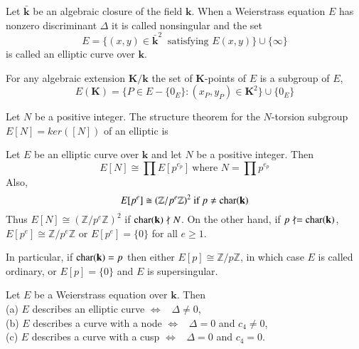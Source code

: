 \begin{definition}
    Let $\bar{\mathbf{k}}$ be an algebraic closure of the field $\mathbf{k}$. When a Weierstrass equation 
    $E$ has nonzero discriminant $\Delta$ it is called nonsingular and the set 
    \begin{equation*}
        E= \{(x,y)\in \bar{\mathbf{k}}^2 \ \text{ satisfying $E(x,y)$}\} \cup \{\infty\}
    \end{equation*}
is called an elliptic curve over $\mathbf{k}$.
\end{definition}
\begin{definition}
    For any algebraic extension $\mathbf{K}/\mathbf{k}$ the set of $\mathbf{K}$-points of $E$ is a subgroup
    of $E$, 
    \begin{equation*}
        E(\mathbf{K})=\{P\in E-\{0_E\}:(x_P,y_P)\in \mathbf{K}^2\}\cup \{0_E\}
    \end{equation*}
\end{definition}
Let $N$ be a positive integer. The structure theorem for the $N$-torsion subgroup $E[N]=ker([N])$ of an elliptic is 
\begin{theorem}
    Let $E$ be an elliptic curve over $\mathbf{k}$ and let $N$ be a positive integer. Then 
    \begin{equation*}
        E[N]\cong \prod E[p^{e_p}] \ \text{where $N=\prod p^{e_p}$}
    \end{equation*}
    Also, 
    \begin{equation*}
        E[p^e]\cong (\mathbb{Z}/p^e\mathbb{Z})^2 \ \text{if $p\neq {\rm char}(\mathbf{k})$}
    \end{equation*}
    Thus $E[N] \cong (\mathbb{Z}/p^e\mathbb{Z})^2 $ if ${\rm char}(\mathbf{k})\nmid N$. On the other hand,
    if $p\nmid ={\rm char}(\mathbf{k})$, $E[p^e] \cong \mathbb{Z}/p^e\mathbb{Z}$ or $E[p^e]=\{0\}$ for all $e\geqslant1$.\par
    In particular, if ${\rm char}(\mathbf{k})=p$ then either $E[p]\cong \mathbb{Z}/p\mathbb{Z}$, in which case $E$ is called
    ordinary, or $E[p]=\{0\}$ and $E$ is supersingular. 
\end{theorem}
\begin{proposition}
    Let $E$ be a Weierstrass equation over $\mathbf{k}$. Then \\
    (a) $E$ describes an elliptic curve $\Longleftrightarrow$ \ $\Delta \neq 0$,\\
    (b) $E$ describes a curve with a node $\Longleftrightarrow$ \ $\Delta=0$ and $c_4\neq0$,\\
    (c) $E$ describes a curve with a cusp $\Longleftrightarrow$ \ $\Delta=0$ and $c_4=0$. 
\end{proposition}
